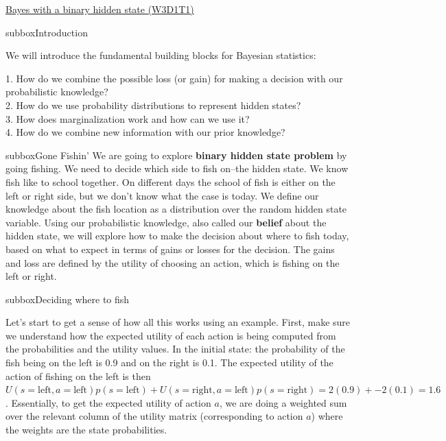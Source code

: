 \clearpage
\begin{textbox}{\href{https://compneuro.neuromatch.io/tutorials/W3D1_BayesianDecisions/student/W3D1_Tutorial1.html}{Bayes with a binary hidden state (W3D1T1)} }
\begin{subbox}{subbox}{Introduction}
\scriptsize

We will introduce the fundamental building blocks for Bayesian statistics: 

1. How do we combine the possible loss (or gain) for making a decision with our probabilistic knowledge?\\
2. 
 How do we use probability distributions to represent hidden states?\\
3. How does marginalization work and how can we use it?\\
 4. How do we combine new information with our prior knowledge? 

\end{subbox}

\begin{subbox}{subbox}{Gone Fishin'}
\scriptsize
We are going to explore \textbf{binary hidden state problem} by going fishing. We need to decide which side to fish on--the hidden state. We know fish like to school together. On different days the school of fish is either on the left or right side, but we don’t know what the case is today. We define our knowledge about the fish location as a distribution over the random hidden state variable. Using our probabilistic knowledge, also called our \textbf{belief} about the hidden state, we will explore how to make the decision about where to fish today, based on what to expect in terms of gains or losses for the decision.
The gains and loss are defined by the utility of choosing an action, which is fishing on the left or right. 

\end{subbox}
\begin{subbox}{subbox}{Deciding where to fish}
\scriptsize

Let's start to get a sense of how all this works using an example. First, make sure we understand how the expected utility of each action is being computed from the probabilities and the utility values. In the initial state: the probability of the fish being on the left is 0.9 and on the right is 0.1. The expected utility of the action of fishing on the left is then $U(s = \textrm{left},a = \textrm{left})p(s = \textrm{left}) + U(s = \textrm{right},a = \textrm{left})p(s = \textrm{right}) = 2(0.9) + -2(0.1) = 1.6$. Essentially, to get the expected utility of action $a$, we are doing a weighted sum over the relevant column of the utility matrix (corresponding to action $a$) where the weights are the state probabilities.


\end{subbox}
\end{textbox}
